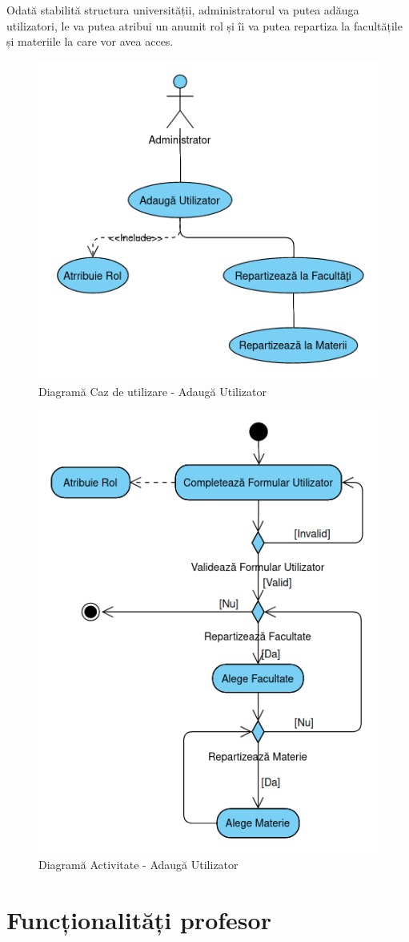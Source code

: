 \documentclass[12pt, a4paper, oneside, romanian]{teza-upb}
\begin{document}
Odată stabilită structura universității, administratorul va putea adăuga utilizatori, le va putea atribui un anumit rol și îi va putea repartiza la facultățile și materiile la care vor avea acces.

\begin{figure}[H]
\centering
\includegraphics*[width=0.525\columnwidth]{diagrama-use-case-adauga-utilizator}
\caption{Diagramă Caz de utilizare - Adaugă Utilizator}
\label{diagrama-use-case-adauga-utilizator}
\end{figure}


\begin{figure}[H]
\centering
\includegraphics*[width=0.6\columnwidth]{diagrama-activitate-adauga-utilizator}
\caption{Diagramă Activitate - Adaugă Utilizator}
\label{diagrama-activitate-adauga-utilizator}
\end{figure}

\section{Funcționalități profesor}
\end{document}

